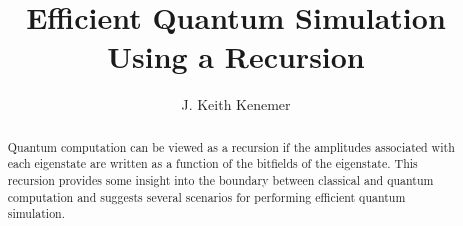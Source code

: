 \documentclass[reqno]{amsart}
\theoremstyle{definition}
\theoremstyle{remark}
\begin{document}

\title{Efficient Quantum Simulation Using a Recursion}

\author{J. Keith Kenemer}






\begin{abstract}
Quantum computation can be viewed as a recursion if the amplitudes associated with each 
eigenstate are written as a function of the bitfields of the eigenstate.  This recursion
provides some insight into the boundary between classical and quantum computation and suggests 
several scenarios for performing efficient quantum simulation.
\end{abstract}


 \maketitle



\end{document}
